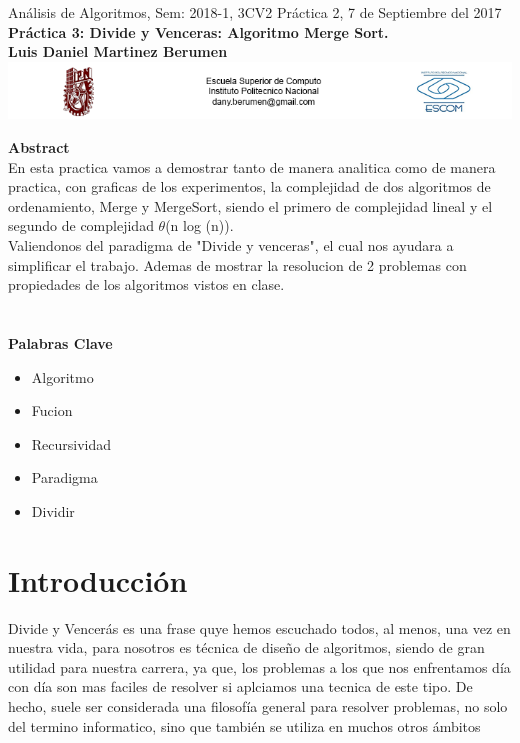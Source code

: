 \documentclass[spanish]{article}
\begin{document}
	\setmarginsrb{30mm}{30mm}{30mm}{30mm}{0pt}{0mm}{0pt}{0mm}
	
	\begin{center}
	{\Large Análisis de Algoritmos, Sem: 2018-1, 3CV2 Práctica 2, 7 de Septiembre del 2017}\\
{\huge {\bf Práctica 3: Divide y Venceras: Algoritmo Merge Sort.}} \\
{\large {\bf Luis Daniel Martinez Berumen}}\\
	\includegraphics[width=1\textwidth]{./imagenes/logos.png}\\
	\end{center}
	\bigskip
	\bigskip
	\bigskip
	{\LARGE {\bf Abstract}}\\
En esta practica vamos a demostrar tanto de manera analitica como de manera practica, con graficas de los experimentos, la complejidad de dos algoritmos de ordenamiento, Merge y MergeSort, siendo el primero de complejidad lineal y el segundo de complejidad $\theta$(n log (n)).\\
Valiendonos del paradigma de "Divide y venceras", el cual nos ayudara a simplificar el trabajo. Ademas de mostrar la resolucion de 2 problemas con propiedades de los algoritmos vistos en clase.\\\\\\
	{\Large {\bf Palabras Clave}}
	\begin{itemize}
		\item Algoritmo
		\item Fucion
		\item Recursividad
		\item Paradigma
		\item Dividir
	\end{itemize}
	
	\section{Introducci\'on}
	Divide y Vencerás es una frase quye hemos escuchado todos, al menos, una vez en nuestra vida, para nosotros 
	es técnica de diseño de algoritmos, siendo de gran utilidad para nuestra carrera, ya que, 
	los problemas a los que nos enfrentamos día con día son mas faciles de resolver si aplciamos una tecnica de este tipo.
	De hecho, suele ser considerada una filosofía general para resolver problemas, no solo del termino informatico, sino que también se utiliza en muchos otros ámbitos
\end{document}
